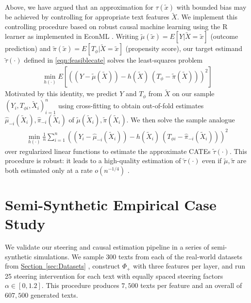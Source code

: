 \documentclass{article}
\theoremstyle{plain}
\theoremstyle{definition}
\theoremstyle{remark}
\newcommand{\myref}[2]{%
    \hyperref[#2]{#1~\ref*{#2}}%
}
\begin{document}
Above, we have argued that an approximation for $\tau(\tilde{x})$ with bounded bias may be achieved by controlling for appropriate text features $\tilde{X}$.
We implement this controlling procedure based on robust causal machine learning \citep[cf.][]{chernozhukov_dml} using the R learner \citep{nie2021quasi} as implemented  in EconML \citep{econml}.
Writing $\tilde{\mu}(\tilde{x}) = E[Y |\tilde{X}{=}\tilde{x}]$ (outcome prediction) and $\tilde{\pi}(\tilde{x}) = E[T_\phi |\tilde{X}{=}\tilde{x}]$ (propensity score), our target estimand $\tilde{\tau}(\cdot)$ defined in \eqref{eqn:feasiblecate} solves the least-squares problem
\begin{align*}
    \min_{h(\cdot)} E[((Y - \tilde{\mu}(\tilde{X})) - h(\tilde{X}) \: (T_\phi - \tilde{\pi}(\tilde{X})))^2]
\end{align*}
Motivated by this identity,
we predict $Y$ and $T_\phi$ from $\tilde{X}$ on our sample $(Y_i,T_{\phi i},\tilde{X}_i)_{i=1}^n$ using cross-fitting to obtain out-of-fold estimates $\hat{\mu}_{-i}(\tilde{X}_i), \hat{\pi}_{-i}(\tilde{X}_i)$ of $\tilde{\mu}(\tilde{X}_i), \tilde{\pi}(\tilde{X}_i)$. We then solve the sample analogue
\begin{align*}
    \min_{h(\cdot)} \frac{1}{n} \sum_{i=1}^n ((Y_i - \hat{\mu}_{-i}(\tilde{X}_i)) - h(\tilde{X}_{i}) \: (T_{\phi i} - \hat{\pi}_{-i}(\tilde{X}_i)))^2
\end{align*}
over regularized linear functions to estimate the approximate CATEs $\tilde{\tau}(\cdot)$.
This procedure is robust: it leads to a high-quality estimation of $\tilde{\tau}(\cdot)$ even if $\tilde{\mu}, \tilde{\pi}$ are both estimated only at a rate $o(n^{-1/4})$ \citep{nie2021quasi}.

\section{Semi-Synthetic Empirical Case Study}\label{sec:simul}

We validate our steering and causal estimation pipeline in a series of semi-synthetic simulations. We sample 300 texts from each of the real-world datasets from \myref{Section}{sec:Datasets}, construct $\Phi_+$ with three features per layer, and run 25 steering intervention for each text with equally spaced steering factors $\alpha \in [0, 1.2]$. This procedure produces $7,500$ texts per feature and an overall of $607,500$ generated texts.
\end{document}
